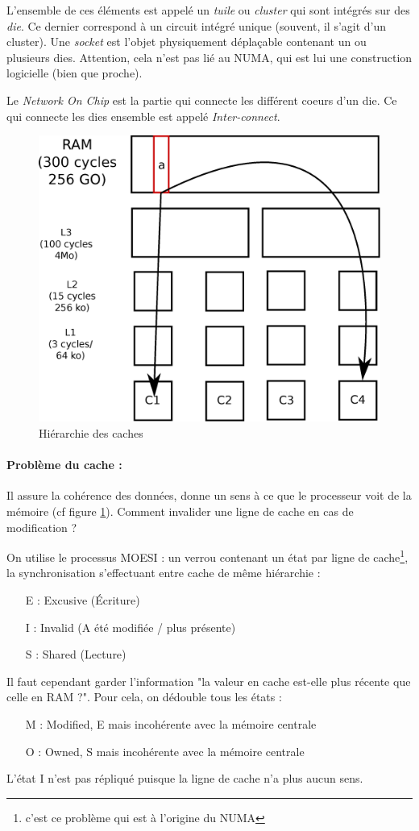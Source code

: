\documentclass{article}
\begin{document}
L'ensemble de ces éléments est appelé un \emph{tuile} ou \emph{cluster} qui sont intégrés sur des \emph{die}. Ce dernier correspond à un circuit intégré unique (souvent, il s'agit d'un cluster). Une \emph{socket} est l'objet physiquement déplaçable contenant un ou plusieurs dies. Attention, cela n'est pas lié au NUMA, qui est lui une construction logicielle (bien que proche).

Le \emph{Network On Chip} est la partie qui connecte les différent coeurs d'un die. Ce qui connecte les dies ensemble est appelé \emph{Inter-connect}.

\begin{figure}[h]
\centering
\includegraphics[width=0.5\linewidth]{cache.eps}
\caption{\label{fig:cache}Hiérarchie des caches}
\end{figure}

\paragraph{Problème du cache :}
Il assure la cohérence des données, donne un sens à ce que le processeur voit de la mémoire (cf figure \ref{fig:cache}). Comment invalider une ligne de cache en cas de modification ?

On utilise le processus MOESI : un verrou contenant un état par ligne de cache\footnote{c'est ce problème qui est à l'origine du NUMA}, la synchronisation s'effectuant entre cache de même hiérarchie :
\begin{itemize}
\item[E :] Excusive (Écriture)
\item[I :] Invalid (A été modifiée / plus présente)
\item[S :] Shared (Lecture)
\end{itemize}
Il faut cependant garder l'information "la valeur en cache est-elle plus récente que celle en RAM ?". Pour cela, on dédouble tous les états :
\begin{itemize}
\item[M :] Modified, E mais incohérente avec la mémoire centrale
\item[O :] Owned, S mais incohérente avec la mémoire centrale
\end{itemize}
L'état I n'est pas répliqué puisque la ligne de cache n'a plus aucun sens.
\bigskip
\end{document}
